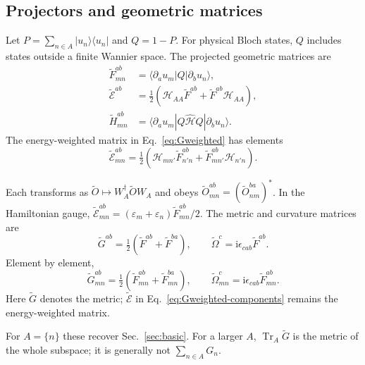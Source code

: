 \documentclass[prx,amsmath,amssymb,superscriptaddress,longbibliography]{revtex4-2}
\newcommand{\Tr}{\operatorname{Tr}}
\newcommand{\ii}{\mathrm{i}}
\begin{document}
\subsection{Projectors and geometric matrices}
Let $P=\sum_{n\in A}|u_n\rangle\langle u_n|$ and $Q=1-P$.
For physical Bloch states, $Q$ includes states outside a finite Wannier space.
The projected geometric matrices are
\begin{align}
 \widetilde F_{mn}^{ab}
 &=\langle\partial_a u_m|Q|\partial_b u_n\rangle,
 \label{eq:Fprojected}\\
 \widetilde{\mathcal E}^{ab}&=\tfrac12(\mathcal H_{AA}\widetilde F^{ab}
                            +\widetilde F^{ab}\mathcal H_{AA}),
 \label{eq:Gweighted}\\
 \widetilde H_{mn}^{ab}
 &=\langle\partial_a u_m|Q\hat{\mathcal H}Q|\partial_b u_n\rangle.
 \label{eq:Hprojected}
\end{align}
The energy-weighted matrix in Eq.~\eqref{eq:Gweighted} has elements
\begin{equation}
 \widetilde{\mathcal E}_{mn}^{ab}=\tfrac12\left(
 \mathcal H_{mn'}\widetilde F_{n'n}^{ab}
 +\widetilde F_{mn'}^{ab}\mathcal H_{n'n}\right).
 \label{eq:Gweighted-components}
\end{equation}

Each transforms as $\widetilde O\mapsto W_A^\dagger\widetilde O W_A$ and obeys
$\widetilde O_{mn}^{ab}=(\widetilde O_{nm}^{ba})^*$.
In the Hamiltonian gauge,
$\widetilde{\mathcal E}_{mn}^{ab}=(\varepsilon_m+\varepsilon_n)\widetilde F_{mn}^{ab}/2$.
The metric and curvature matrices are
\begin{equation}
 \widetilde G^{ab}=\tfrac12(\widetilde F^{ab}+\widetilde F^{ba}),\qquad
 \widetilde\Omega^c=\ii\epsilon_{cab}\widetilde F^{ab}.
 \label{eq:projected-geometry}
\end{equation}
Element by element,
\begin{equation}
 \widetilde G_{mn}^{ab}=\tfrac12(\widetilde F_{mn}^{ab}+\widetilde F_{mn}^{ba}),\qquad
 \widetilde\Omega_{mn}^c=\ii\epsilon_{cab}\widetilde F_{mn}^{ab}.
 \label{eq:projected-geometry-components}
\end{equation}
Here $\widetilde G$ denotes the metric; $\widetilde{\mathcal E}$ in
Eq.~\eqref{eq:Gweighted-components} remains the energy-weighted matrix.

For $A=\{n\}$ these recover Sec.~\ref{sec:basic}.
For a larger $A$, $\Tr_A\widetilde G$ is the metric of the whole subspace;
it is generally not $\sum_{n\in A}G_n$.
\end{document}
